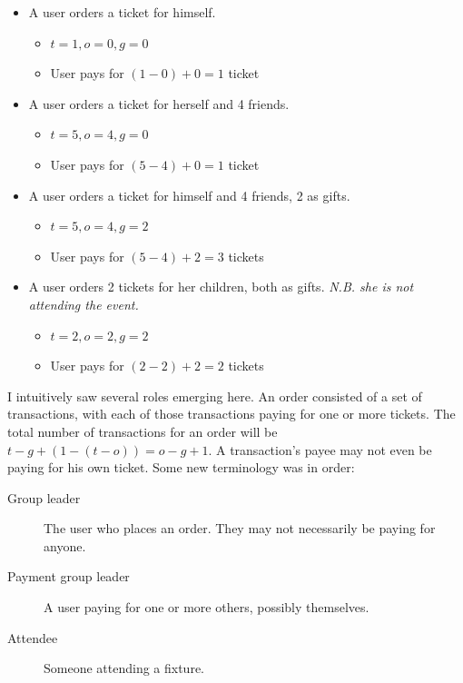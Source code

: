 \documentclass[12pt,a4paper]{bhamdissertation}
\begin{document}
\begin{itemize}
    \item A user orders a ticket for himself.
    \begin{itemize}
        \item $t = 1, o = 0, g = 0$
        \item User pays for $(1 - 0) + 0 = 1$ ticket
    \end{itemize}
    \item A user orders a ticket for herself and 4 friends.
    \begin{itemize}
        \item $t = 5, o = 4, g = 0$
        \item User pays for $(5 - 4) + 0 = 1$ ticket
    \end{itemize}
    \item A user orders a ticket for himself and 4 friends, 2 as gifts.
    \begin{itemize}
        \item $t = 5, o = 4, g = 2$
        \item User pays for $(5 - 4) + 2 = 3$ tickets
    \end{itemize}
    \item A user orders 2 tickets for her children, both as gifts.
    \textit{N.B. she is not attending the event.}
    \begin{itemize}
        \item $t = 2, o = 2, g = 2$
        \item User pays for $(2 - 2) + 2 = 2$ tickets
    \end{itemize}
\end{itemize}

I intuitively saw several roles emerging here. An order consisted of a set of transactions, with each of those transactions paying for one or more tickets. The total number of transactions for an order will be $t - g + (1 - (t - o)) = o - g + 1$. A transaction's payee may not even be paying for his own ticket. Some new terminology was in order:

\begin{description}
    \item[Group leader] The user who places an order. They may not necessarily be paying for anyone.
    \item[Payment group leader] A user paying for one or more others, possibly themselves.
    \item[Attendee] Someone attending a fixture.
\end{description}
\end{document}
